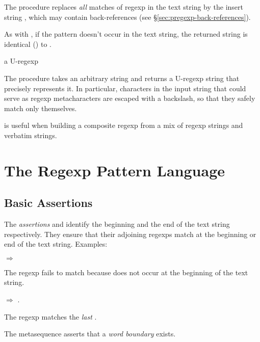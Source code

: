 The  procedure replaces \emph{all} matches of
regexp  in the text string  by the insert string
, which may contain back-references (see
\S\ref{sec:pregexp-back-references}).

As with , if the pattern doesn't occur in the
text string, the returned string is identical () to
.

\begin{procedure}
\end{procedure}
\returns{} a U-regexp

The  procedure takes an arbitrary string 
and returns a U-regexp string that precisely represents it.  In
particular, characters in the input string that could serve as regexp
metacharacters are escaped with a backslash, so that they safely match
only themselves.

 is useful when building a composite regexp from a
mix of regexp strings and verbatim strings.

\section {The Regexp Pattern Language}

\subsection {Basic Assertions}

The \emph{assertions} \code{\textasciicircum} and \code{\$} identify
the beginning and the end of the text string respectively.  They
ensure that their adjoining regexps match at the beginning or end of
the text string.  Examples:

$\Rightarrow$ 

The regexp fails to match because  does not occur at the
beginning of the text string.

$\Rightarrow$ .

The regexp matches the \emph{last} .

The metasequence  asserts that a \emph{word
  boundary} exists.

